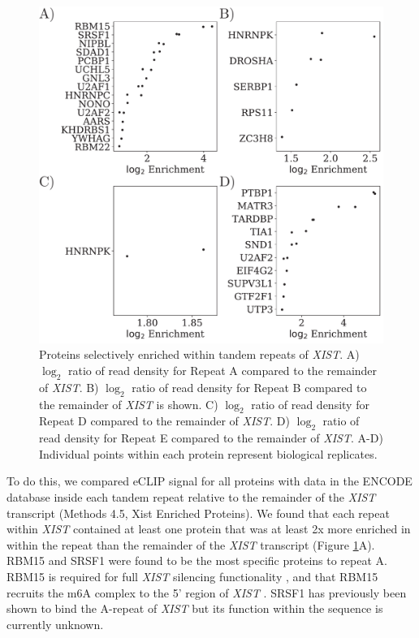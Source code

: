 \begin{figure}[h!]
\centering
\includegraphics[width=.8\textwidth]{images/sigproteins.pdf}
\caption[\emph{XIST} tandem repeat enriched proteins]{Proteins selectively enriched within tandem repeats of \emph{XIST}. A) $\log_2$ ratio of read density for Repeat A compared to the remainder of \emph{XIST}. B) $\log_2$ ratio of read density for Repeat B compared to the remainder of \emph{XIST} is shown. C) $\log_2$ ratio of read density for Repeat D compared to the remainder of \emph{XIST}. D) $\log_2$ ratio of read density for Repeat E compared to the remainder of \emph{XIST}. A-D) Individual points within each protein represent biological replicates. }
\label{fig:xistproteins}
\end{figure}

To do this, we compared eCLIP signal for all proteins with data in the ENCODE database inside each tandem repeat relative to the remainder of the \emph{XIST} transcript (Methods 4.5, Xist Enriched Proteins). We found that each repeat within \emph{XIST} contained at least one protein that was at least 2x more enriched in within the repeat than the remainder of the \emph{XIST} transcript (Figure \ref{fig:xistproteins}A). RBM15 and SRSF1 were found to be the most specific proteins to repeat A. RBM15 is required for full \emph{XIST} silencing functionality \cite{Moindrot2015ASilencing}, and that RBM15 recruits the m6A complex to the 5' region of \emph{XIST} \cite{Patil2016M6Repression}. SRSF1 has previously been shown to bind the A-repeat of \emph{XIST} but its function within the sequence is currently unknown.


